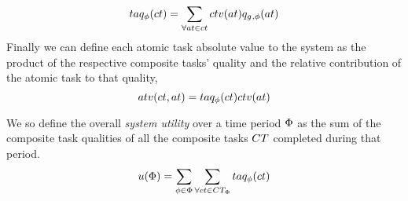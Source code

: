 \begin{equation}
\functionCompositeTaskQuality{}{} = \sum\limits_{\forall \varAtomicTask{}{} \in \varCompositeTask{}{}}
\functionCompositeTaskValue{}{}\functionAtomicTaskQualitySignature{}{}	
\end{equation}
Finally we can define each atomic task absolute value to the system as the product of the respective composite tasks' quality and the relative contribution of the atomic task to that quality,
\begin{equation}
	\functionTaskAbsoluteValue{}{} = 
	\functionCompositeTaskQuality{}{}\functionCompositeTaskValue{}{}
\end{equation}

We so define the overall \textit{system utility} over a time period $\Phi$ as the sum of the composite task qualities of all the composite tasks $\setCompositeTask{}{}$ completed during that period.
	\begin{equation}
		\label{eq:system_utility}
		\functionSystemUtility{}{} = \sum\limits_{\varTime{}{} \in \setTime{}{}}
		\sum\limits_{\forall \varCompositeTask{}{} \in \setCompositeTask{\setTime{}{}}{}}
		\functionCompositeTaskQuality{}{}
	\end{equation}